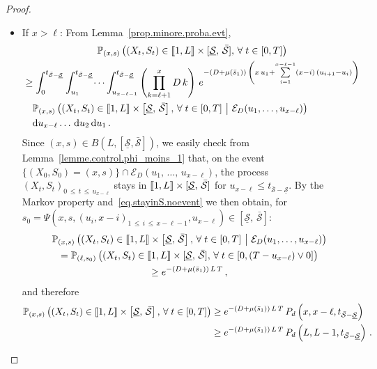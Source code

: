 \documentclass[AHL,Unicode,longabstracts,published]{cedram}
\newcommand{\llbracket}{\mathopen{[\mkern -2.7mu[}}
\newcommand{\rrbracket}{\mathclose{]\mkern -2.7mu]}}
\newcommand{\PP}{\mathbb{P}}
\newcommand{\clE}{\mathcal{E}}
\newcommand{\dif}{\mathrm{d}}
\newcommand{\Smin}{\underline{\mathcal{S}}}
\newcommand{\Smax}{\bar{\mathcal{S}}}
\newcommand{\barmu}{\mu(\bar s_1)}
\newcommand{\setunL}{\llbracket 1, L\rrbracket}
\newcommand{\1}{\mathbf{1}}
\let\oldforall\forall
\renewcommand*{\forall}{\mathrel{\oldforall}}
\begin{document}
\begin{proof}
\begin{itemize}
\item If $x > \ell$: From Lemma~\ref{prop.minore.proba.evt},
\begin{multline*}
\PP_{(x,s)}
\left(\left(X_t,S_t\right) \in\setunL \times [\Smin, \, \Smax], \,
\forall t\in[0,T]\right)
\\
\begin{aligned}
&\geq \int_0^{t_{\Smax-\Smin}} \int_{u_1}^{t_{\Smax-\Smin}}\dots \int_{u_{x-\ell-1}}^{t_{\Smax-\Smin}}
\left(\prod_{k=\ell+1}^{x}D\,k\right)\, e^{-(D+\barmu)\,\left(x\,u_1+
\sum\limits_{i=1}^{x-\ell-1}(x-i)\,(u_{i+1}-u_{i})\right)}\,
\\
& \quad
\PP_{(x,s)}
\left((X_t,S_t) \in \setunL\times \left[\Smin, \, \Smax\right], \,
\forall t\in[0,T] \ \middle| \ \clE_D(u_1,\dots,u_{x-\ell}) \right)\,
\\
& \quad
\dif u_{x-\ell}\dots\,\dif u_2\,\dif u_1\,.
\end{aligned}
\end{multline*}
Since $(x,s)\in B(L,[\Smin,\Smax])$, we easily check from Lemma~\ref{lemme.control.phi_moins_1} that, on the event $\{(X_0,S_0)=(x,s)\}\cap\clE_D(u_1,\,\dots,\,u_{x-\ell})$, the process $(X_t,S_t)_{0\,\leq\,t\,\leq\,u_{x-\ell}}$ stays in $\setunL \times [\Smin, \, \Smax]$ for $u_{x-\ell}\leq t_{\Smax-\Smin}$. By the Markov property and~\eqref{eq.stayinS.noevent} we then obtain, for $s_0=\Psi(x,s,(u_i,x-i)_{1\,\leq \,i\,\leq\,x-\ell-1},u_{x-\ell})\in [\Smin, \, \Smax]$:
\begin{multline*}
\PP_{(x,s)}
\left((X_t,S_t) \in \setunL\times \left[\Smin, \, \Smax\right], \,
\forall t\in[0,T] \ \middle| \ \clE_D(u_1,\dots,u_{x-\ell}) \right)
\\
= \PP_{(\ell,s_0)}
\left(\left(X_t,S_t\right) \in \setunL \times [\Smin, \, \Smax], \,
\forall t\in\left[0,(T-u_{x-\ell})\vee 0\right] \right)
\\
\geq e^{-(D+\barmu)\,L\,T}\,,
\end{multline*}
and therefore
\begin{align*}
\PP_{(x,s)}
\left(\left(X_t,S_t\right) \in \setunL \times \left[\Smin, \, \Smax\right], \,
\forall t\in[0,T]\right) & \geq e^{-(D+\barmu)\,L\,T}\, P_d\left(x,x-\ell, t_{\Smax-\Smin}\right)
\\ & \geq e^{-(D+\barmu)\,L\,T}\, P_d\left(L,L-1, t_{\Smax-\Smin}\right)\,.
\end{align*}


\end{itemize}
\end{proof}
\end{document}
